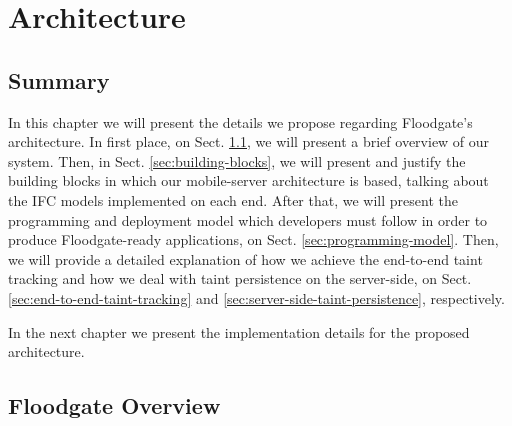 \chapter{Architecture}
\label{sec:Architecture}
 
 
\section*{Summary}

In this chapter we will present the details we propose regarding Floodgate's architecture. In first place, on Sect. \ref{sec:floodgate-overview}, we will present a brief overview of our system. Then, in Sect. \ref{sec:building-blocks}, we will present and justify the building blocks in which our mobile-server architecture is based, talking about the IFC models implemented on each end. After that, we will present the programming and deployment model which developers must follow in order to produce Floodgate-ready applications, on Sect. \ref{sec:programming-model}. Then, we will provide a detailed explanation of how we achieve the end-to-end taint tracking and how we deal with taint persistence on the server-side, on Sect. \ref{sec:end-to-end-taint-tracking} and \ref{sec:server-side-taint-persistence}, respectively.

In the next chapter we present the implementation details for the proposed architecture.

\section{Floodgate Overview}
\label{sec:floodgate-overview}

